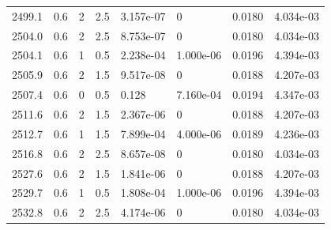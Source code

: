\documentclass[preview]{standalone}
\begin{document}
{{{{{{{{\begin{tabular}{L{1.2cm}C{1.2cm} C{0.3cm}C{0.5cm} C{1.4cm}C{1.4cm} C{1.4cm}C{1.4cm}}
  2499.1  &   0.6  & 2     & 2.5 &  3.157e-07  & 0  & 0.0180 &  4.034e-03   \\ 
  2504.0  &   0.6  & 2     & 2.5 &  8.753e-07  & 0  & 0.0180 &  4.034e-03   \\ 
  2504.1  &   0.6  & 1     & 0.5 &  2.238e-04  & 1.000e-06  & 0.0196 &  4.394e-03   \\ 
  2505.9  &   0.6  & 2     & 1.5 &  9.517e-08  & 0  & 0.0188 &  4.207e-03   \\ 
  2507.4  &   0.6  & 0     & 0.5 &  0.128  & 7.160e-04  & 0.0194 &  4.347e-03   \\ 
  2511.6  &   0.6  & 2     & 1.5 &  2.367e-06  & 0  & 0.0188 &  4.207e-03   \\ 
  2512.7  &   0.6  & 1     & 1.5 &  7.899e-04  & 4.000e-06  & 0.0189 &  4.236e-03   \\ 
  2516.8  &   0.6  & 2     & 2.5 &  8.657e-08  & 0  & 0.0180 &  4.034e-03   \\ 
  2527.6  &   0.6  & 2     & 1.5 &  1.841e-06  & 0  & 0.0188 &  4.207e-03   \\ 
  2529.7  &   0.6  & 1     & 0.5 &  1.808e-04  & 1.000e-06  & 0.0196 &  4.394e-03   \\ 
  2532.8  &   0.6  & 2     & 2.5 &  4.174e-06  & 0  & 0.0180 &  4.034e-03   \\ 
\hline 
\end{tabular} 

}}}}}}}}
\end{document}
